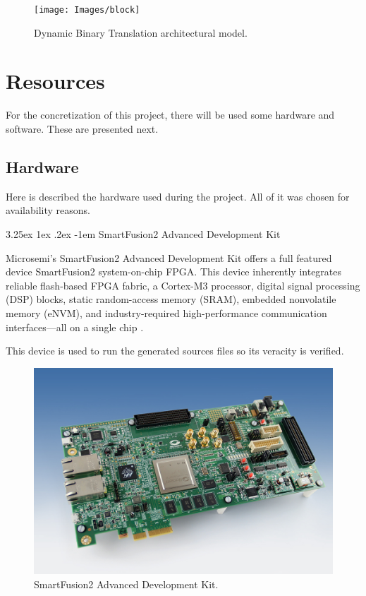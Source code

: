 \documentclass{report}
\makeatletter
\renewcommand\paragraph{\@startsection{paragraph}{5}{\z@}%
	{3.25ex \@plus1ex \@minus.2ex}%
	{-1em}%
	{\normalfont\normalsize\bfseries}}
\makeatother
\begin{document}
	\begin{figure} [H]
		\centering
		\texttt{[image: Images/block]}
		\caption{Dynamic Binary Translation architectural model.}
		\label{fig:block}
	\end{figure}


	\section{Resources}
	
		\par For the concretization of this project, there will be used some hardware and software. These are presented next.

		\subsection{Hardware}
		
			\par Here is described the hardware used during the project. All of it was chosen for availability reasons. 

			\paragraph{SmartFusion2 Advanced Development Kit}
			
			\par Microsemi's SmartFusion2 Advanced Development Kit offers a full featured device SmartFusion2 system-on-chip FPGA. This device inherently integrates reliable flash-based FPGA fabric, a Cortex-M3 processor, digital signal processing (DSP) blocks, static random-access memory (SRAM), embedded nonvolatile memory (eNVM), and industry-required high-performance communication interfaces—all on a single chip \cite{microsemi}. 
			\par This device is used to run the generated sources files so its veracity is verified. 
			
			\begin{figure} [H]
				\centering
				\includegraphics[width=0.5\linewidth]{Images/microsemi}
				\caption{SmartFusion2 Advanced Development Kit.}
				\label{fig:microsemi}
			\end{figure}
\end{document}
